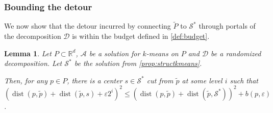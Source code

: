 \documentclass[11pt]{article}
\newtheorem{lemma}[theorem]{Lemma}
\newcommand{\R}{\mathbb R}
\newcommand{\eps}{\varepsilon}
\renewcommand{\tilde}{\widetilde}
\newcommand{\calD}{\mathcal {D}}
\newcommand{\calS}{\mathcal {S}}
\newcommand{\calL}{\mathcal{A}}
\DeclareMathOperator{\dist}{dist}
\begin{document}
\subsubsection{Bounding the detour}

We now show that the detour incurred by connecting $\tilde P$ to $\calS^*$ through portals of the decomposition $\calD$ is within the budget defined in \cref{def:budget}. 

\begin{lemma}
  \label{lem:detourkmeans}
Let $P \subset \R^d$, $\calL$ be a solution for $k$-means on $P$ and $\calD$ be a randomized decomposition. 
Let $\calS^*$ be the solution from \cref{prop:structkmeans}.

 Then, for any $p \in P$, there is a center $s \in \calS^*$ cut from $\tilde p$ at some level $i$ such that $(\dist(p, \tilde p) + \dist(\tilde p, s) + \eps 2^i)^2 \leq (\dist(p, \tilde p) + \dist(\tilde p, \calS^*))^2 + b(p, \eps)$.
 \end{lemma}
\end{document}
